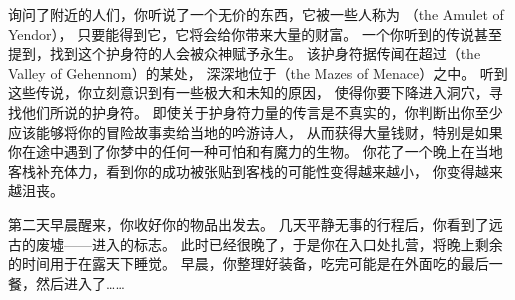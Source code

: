\documentclass[a4paper, 10pt]{article}
\newcommand{\nd}{\noindent}
\begin{document}
询问了附近的人们，你听说了一个无价的东西，它被一些人称为\zhTransAmuletOfYendor
（the Amulet of Yendor），
只要能得到它，它将会给你带来大量的财富。
一个你听到的传说甚至提到，找到这个护身符的人会被众神赋予永生。
该护身符据传闻在超过\zhTransValleyOfGehennom（the Valley of Gehennom）的某处，
深深地位于\zhTransMazesOfMenace（the Mazes of Menace）之中。
听到这些传说，你立刻意识到有一些极大和未知的原因，
使得你要下降进入洞穴，寻找他们所说的护身符。
即使关于护身符力量的传言是不真实的，你判断出你至少应该能够将你的冒险故事卖给当地的吟游诗人，
从而获得大量钱财，特别是如果你在途中遇到了你梦中的任何一种可怕和有魔力的生物。
你花了一个晚上在当地客栈补充体力，看到你的成功被张贴到客栈的可能性变得越来越小，
你变得越来越沮丧。

第二天早晨醒来，你收好你的物品出发去\zhTransDungeon{}。
几天平静无事的行程后，你看到了远古的废墟——进入\zhTransMazesOfMenace{}的标志。
此时已经很晚了，于是你在入口处扎营，将晚上剩余的时间用于在露天下睡觉。
早晨，你整理好装备，吃完可能是在外面吃的最后一餐，然后进入了\zhTransDungeon{}……

\end{document}
